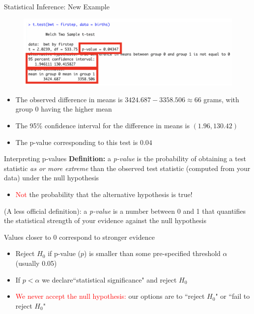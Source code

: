 \documentclass[10pt,t]{beamer}
\begin{document}
\begin{frame}{Statistical Inference: New Example}
\begin{figure}
	\centering \includegraphics[scale=0.5]{ttest4.png}
\end{figure}

\begin{itemize}
	\item The observed difference in means is $3424.687-  3358.506 \approx 66$ grams, with group $0$ having the higher mean
	\item The 95\% confidence interval for the difference in means is $(1.96, 130.42)$
	\item The p-value corresponding to this test is $0.04$
\end{itemize}

\end{frame}


\begin{frame}{Interpreting p-values}
\textbf{Definition:} a \textit{p-value} is the probability of obtaining a test statistic \textit{as or more extreme} than the observed test statistic (computed from your data) under the null hypothesis

\begin{itemize}
	\item[] \textcolor{red}{Not} the probability that the alternative hypothesis is true! 
\end{itemize}

\vspace{0.3cm} 

(A less official definition): a \textit{p-value} is a number between 0 and 1 that quantifies the statistical strength of your evidence against the null hypothesis

\vspace{0.3cm}

Values closer to 0 correspond to stronger evidence
\begin{itemize}
	\item Reject $H_0$ if p-value ($p$) is smaller than some pre-specified threshold $\alpha$ (usually 0.05)
	\item If $p < \alpha$ we declare``statistical significance" and reject $H_0$
	\item \textcolor{red}{We never accept the null hypothesis:} our options are to ``reject $H_0$" or ``fail to reject $H_0$"
\end{itemize}

\end{frame}
\end{document}
